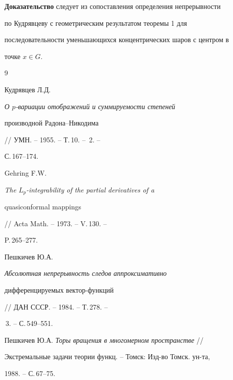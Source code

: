  


{\bf Доказательство} следует из сопоставления определения непрерывности 


по Кудрявцеву с геометрическим результатом теоремы 1 для 


последовательности уменьшающихся концентрических шаров с центром в 


точке $x\in G$. 


 


 


\begin{thebibliography}{9} 


 




Кудрявцев Л.Д. {\em О $p$-вариации отображений и суммируемости степеней 


производной Радона--Никодима} // УМН. -- 1955. -- Т.\,10. -- \No\,2. -- 


С.\,167--174. 




Gehring F.W. {\em The $L_p$-integrability of the partial derivatives of a 


quasiconformal mappings} // Acta Math. -- 1973. -- V.\,130. -- 


P.\,265--277. 




Пешкичев Ю.А. {\em Абсолютная непрерывность следов аппроксимативно 


дифференцируемых вектор-функций} // ДАН СССР. -- 1984. -- Т.\,278. -- 


\No\,3. -- С.\,549--551. 




Пешкичев Ю.А. {\em Торы вращения в многомерном пространстве} // 


Экстремальные задачи теории функц. -- Томск: Изд-во Томск. ун-та, 


1988. -- С.\,67--75. 


 


\end{thebibliography} 


 


\vskip 2cm 


 






 


\label{end} 


 


